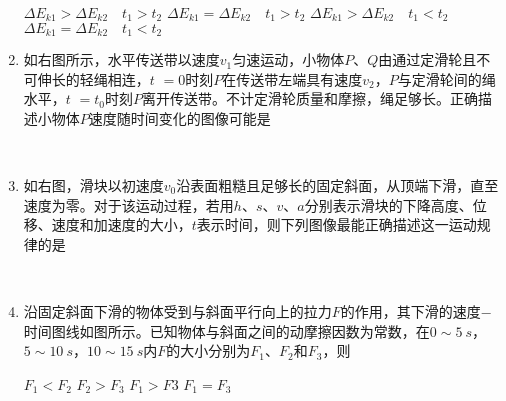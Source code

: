 \begin{enumerate}[leftmargin=0em]
\fourchoices
{$\Delta E _ { k 1 } > \Delta E _ { k 2 } \quad t _ { 1 } > t _ { 2 }$}
{$\Delta E _ { k 1 } = \Delta E _ { k 2 } \quad t _ { 1 } > t _ { 2 }$}
{$\Delta E _ { k 1 } > \Delta E _ { k 2 } \quad t _ { 1 } < t _ { 2 }$}
{$\Delta E _ { k 1 } = \Delta E _ { k 2 } \quad t _ { 1 } < t _ { 2 }$}





\item 
{}
如右图所示，水平传送带以速度$ v_{1} $匀速运动，小物体$ P $、$ Q $由通过定滑轮且不可伸长的轻绳相连，$ t $ $ = 0 $时刻$ P $在传送带左端具有速度$ v_{2} $，$ P $与定滑轮间的绳水平，$ t $ $ = t_{0} $时刻$ P $离开传送带。不计定滑轮质量和摩擦，绳足够长。正确描述小物体$ P $速度随时间变化的图像可能是  
\begin{figure}[h!]
\centering
\\
  
\end{figure}









\item 
{}
如右图，滑块以初速度$ v_{0} $沿表面粗糙且足够长的固定斜面，从顶端下滑，直至速度为零。对于该运动过程，若用$ h $、$ s $、$ v $、$ a $分别表示滑块的下降高度、位移、速度和加速度的大小，$ t $表示时间，则下列图像最能正确描述这一运动规律的是  
\begin{figure}[h!]
\centering
\\
  
\end{figure}

\item 
{}
沿固定斜面下滑的物体受到与斜面平行向上的拉力$ F $的作用，其下滑的速度$ - $时间图线如图所示。已知物体与斜面之间的动摩擦因数为常数，在$ 0 \sim 5\ s $，$ 5 \sim 10\ s $，$ 10 \sim 15\ s $内$ F $的大小分别为$ F_{1} $、$ F_{2} $和$ F_{3} $，则  
\begin{figure}[h!]
\centering

\end{figure}

\fourchoices
{$ F_{1} < F_{2} $ }
{$ F_{2} >F_3 $}
{$ F_{1} >F3 $ }
{$ F_{1} =F_3 $}




\end{enumerate}
